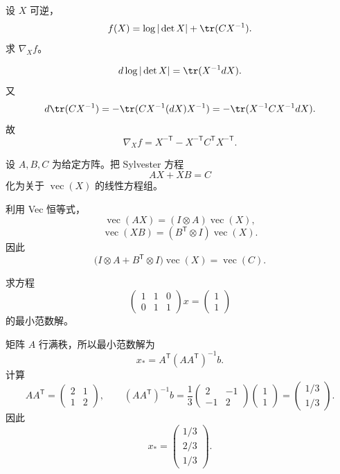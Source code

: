 \begin{exercise}[level=standard]
设 $X$ 可逆，
\[
f(X)=\log|\det X|+\tr(CX^{-1}).
\]
求 $\nabla_Xf$。
\begin{solution}
\[
d\log|\det X|=\tr(X^{-1}dX).
\]
又
\[
d\tr(CX^{-1})
=-\tr(CX^{-1}(dX)X^{-1})
=-\tr(X^{-1}CX^{-1}dX).
\]
故
\[
\nabla_Xf
=X^{-\mathsf T}-X^{-\mathsf T}C^{\mathsf T}X^{-\mathsf T}.
\]
\end{solution}
\end{exercise}

\begin{exercise}[level=standard]
设 $A,B,C$ 为给定方阵。把 Sylvester 方程
\[
AX+XB=C
\]
化为关于 $\operatorname{vec}(X)$ 的线性方程组。
\begin{solution}
利用 Vec 恒等式，
\[
\operatorname{vec}(AX)=(I\otimes A)\operatorname{vec}(X),
\]
\[
\operatorname{vec}(XB)=(B^{\mathsf T}\otimes I)\operatorname{vec}(X).
\]
因此
\[
\bigl(I\otimes A+B^{\mathsf T}\otimes I\bigr)
\operatorname{vec}(X)=\operatorname{vec}(C).
\]
\end{solution}
\end{exercise}

\begin{exercise}[level=standard]
求方程
\[
\begin{pmatrix}1&1&0\\0&1&1\end{pmatrix}x
=\begin{pmatrix}1\\1\end{pmatrix}
\]
的最小范数解。
\begin{solution}
矩阵 $A$ 行满秩，所以最小范数解为
\[
x_*=A^{\mathsf T}(AA^{\mathsf T})^{-1}b.
\]
计算
\[
AA^{\mathsf T}=\begin{pmatrix}2&1\\1&2\end{pmatrix},
\qquad
(AA^{\mathsf T})^{-1}b
=\frac13\begin{pmatrix}2&-1\\-1&2\end{pmatrix}
\begin{pmatrix}1\\1\end{pmatrix}
=\begin{pmatrix}1/3\\1/3\end{pmatrix}.
\]
因此
\[
x_*=\begin{pmatrix}1/3\\2/3\\1/3\end{pmatrix}.
\]
\end{solution}
\end{exercise}


